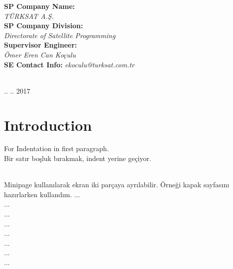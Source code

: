 \begin{titlepage}
\begin{minipage}{0.35\textwidth}
\begin{flushleft}
\end{flushleft}
\end{minipage}
\begin{minipage}{0.6\textwidth}
\begin{flushright} \large
\textbf{SP Company Name:} \\ 
 \textit{TÜRKSAT A.Ş.} \\
\textbf{SP Company Division:} \\ 
 \textit{Directorate of Satellite Programming} \\
\textbf{Supervisor Engineer:} \\
 \textit{Ömer Eren Can Koçulu} \\
\textbf{SE Contact Info:} 
 \textit{ekoculu@turksat.com.tr} 
\end{flushright}
\end{minipage}\\[3cm]



{\large .. .. 2017}\\[1cm] %


\vfill %

\end{titlepage}


\tableofcontents
\newpage



\section{Introduction}
\- 
\indent For Indentation in first paragraph.
\\

	Bir satır boşluk bırakmak, indent yerine geçiyor.

\- \\ \indent
	Minipage kullanılarak ekran iki parçaya ayrılabilir. Örneği kapak sayfasını hazırlarken kullandım.
	...  \\
	...  \\
	...  \\
	...  \\
	...  \\
	...  \\
	...  \\
	...  \\
	
